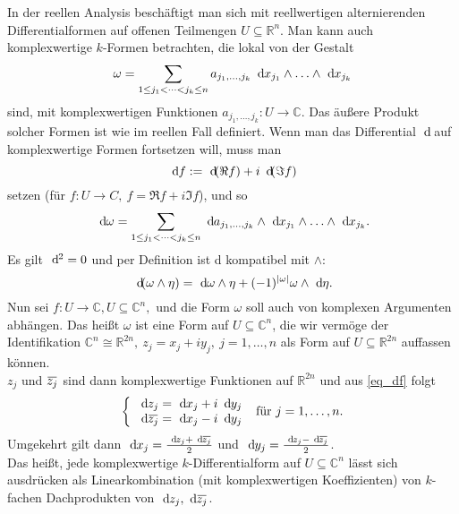\documentclass[a4paper,12pt]{article}
\theoremstyle{newthm}
\theoremstyle{newdef}
\theoremstyle{newrem}
\newcommand{\R}{\mathbb{R}}
\newcommand{\C}{\mathbb{C}}
\renewcommand{\d}{\ \operatorname{d}\hspace{-2px}}
\newcommand{\overbar}[1]{\mkern 1.5mu\overline{\mkern-1.5mu#1\mkern-1.5mu}\mkern 1.5mu}
\begin{document}
		In der reellen Analysis beschäftigt man sich mit reellwertigen alternierenden Differentialformen auf offenen Teilmengen $ U \subseteq \R^n $. Man kann auch komplexwertige $k$-Formen betrachten, die lokal von der Gestalt
		\[ \omega = \sum_{1 \leq j_1 < \dots < j_k \leq n} a_{j_1,\dots,j_k} \d x_{j_1} \wedge \dotsc \wedge \d x_{j_k} \]
		sind, mit komplexwertigen Funktionen $ a_{j_1,\dots,j_k}: U \to \C $. Das äußere Produkt solcher Formen ist wie im reellen Fall definiert. Wenn man das Differential $\d$ auf komplexwertige Formen fortsetzen will, muss man 
		\begin{equation}\label{eq_df}
			\d f := \d (\Re f) + i \d (\Im f)
		\end{equation}
		 setzen (für $ f: U \to C,\ f = \Re f + i \Im f $), und so 
		\[ \d \omega = \sum_{1 \leq j_1 < \dots < j_k \leq n} \d a_{j_1,\dotsc,j_k} \wedge \d x_{j_1} \wedge \dotsc \wedge \d x_{j_k}. \]
		Es gilt $ \d^2 = 0 $ und per Definition ist d kompatibel mit $\wedge$: 
		$$ \d(\omega \wedge \eta) = \d \omega \wedge \eta + (-1)^{|\omega|} \omega\wedge \d \eta. $$
		Nun sei $ f: U \to \C, U \subseteq \C^n, $ und die Form $\omega$	soll auch von komplexen Argumenten abhängen. Das heißt $\omega$ ist eine Form auf $ U \subseteq \C^n $, die wir vermöge der Identifikation $ \C^n \cong \R^{2n},\ z_j = x_j + iy_j,\ j=1,\dotsc,n $ als Form auf $ U \subseteq \R^{2n} $ auffassen können.\\
		$ z_j $ und $ \overbar{z_j} $ sind dann komplexwertige Funktionen auf $ \R^{2n} $ und aus \ref{eq_df} folgt
		\[
		\left\{\begin{array}{ll}
			\d z_j = \d x_j + i \d y_j\\
			\d\overbar{z_j} = \d x_j - i \d y_j
		\end{array} \right.\ \text{für } j=1,\dotsc,n.
		\]
		Umgekehrt gilt dann $ \d x_j = \frac{\d z_j + \d\overbar{z_j}}{2} $ und $ \d y_j = \frac{\d z_j - \d\overbar{z_j}}{2} $.\\
		Das heißt, jede komplexwertige $k$-Differentialform auf $ U \subseteq \C^n $ lässt sich ausdrücken als Linearkombination (mit komplexwertigen Koeffizienten) von $k$-fachen Dachprodukten von $ \d z_j, \d \overbar{z_j} $.
		
\end{document}
